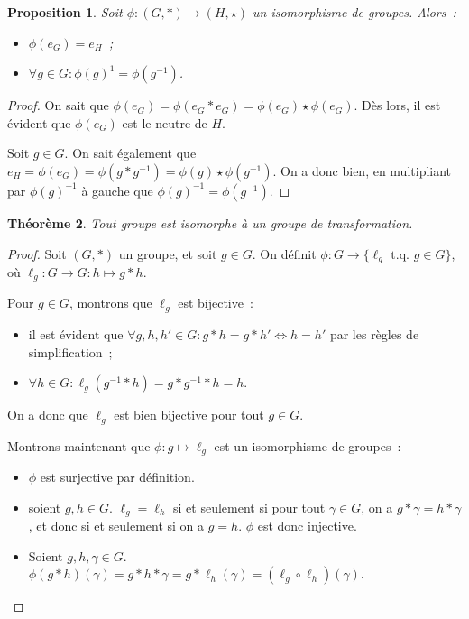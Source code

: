 \documentclass{article}
\newtheorem{thm}{Théorème}[section]
\newtheorem{prp}[thm]{Proposition}
\theoremstyle{definition}
\theoremstyle{remark}
\newcommand{\tq}{\text{ t.q. }}
\begin{document}
		\begin{prp} Soit $\phi : (G, *) \to (H, \star)$ un isomorphisme de groupes. Alors~:
		\begin{itemize}
			\item $\phi(e_G) = e_H$~;
			\item $\forall g \in G : \phi(g)^1 = \phi(g^{-1})$.
		\end{itemize}
		\end{prp}

		\begin{proof} On sait que $\phi(e_G) = \phi(e_G * e_G) = \phi(e_G) \star \phi(e_G)$. Dès lors, il est évident que $\phi(e_G)$ est le neutre de $H$.

		Soit $g \in G$. On sait également que $e_H = \phi(e_G) = \phi(g * g^{-1}) = \phi(g) \star \phi(g^{-1})$. On a donc bien, en multipliant par
		$\phi(g)^{-1}$ à gauche que $\phi(g)^{-1} = \phi(g^{-1})$.
		\end{proof}

		\begin{thm} Tout groupe est isomorphe à un groupe de transformation.
		\end{thm}

		\begin{proof} Soit $(G, *)$ un groupe, et soit $g \in G$. On définit $\phi : G \to \{\ell_g \tq g \in G\}$, où $\ell_g : G \to G : h \mapsto g*h$.

		Pour $g \in G$, montrons que $\ell_g$ est bijective~:
		\begin{itemize}
			\item il est évident que $\forall g, h, h' \in G : g*h = g*h' \iff h=h'$ par les règles de simplification~;
			\item $\forall h \in G : \ell_g(g^{-1}*h) = g*g^{-1}*h = h$.
		\end{itemize}

		On a donc que $\ell_g$ est bien bijective pour tout $g \in G$.

		Montrons maintenant que $\phi : g \mapsto \ell_g$ est un isomorphisme de groupes~:
		\begin{itemize}
			\item $\phi$ est surjective par définition.
			\item soient $g, h \in G$. $\ell_g = \ell_h$ si et seulement si pour tout $\gamma \in G$, on a $g*\gamma = h*\gamma$, et donc si et seulement si
			on a $g = h$. $\phi$ est donc injective.
			\item Soient $g, h, \gamma \in G$. $\phi(g * h)(\gamma) = g*h*\gamma = g*\ell_h(\gamma) = (\ell_g \circ \ell_h)(\gamma)$.
		\end{itemize}
		\end{proof}
\end{document}
